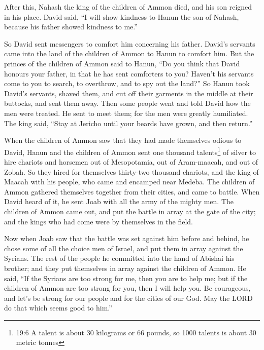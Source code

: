  After this, Nahash the king of the children of Ammon died,
and his son reigned in his place.  David said, ``I will show
kindness to Hanun the son of Nahash, because his father showed kindness
to me.''

So David sent messengers to comfort him concerning his father. David's
servants came into the land of the children of Ammon to Hanun to comfort
him.  But the princes of the children of Ammon said to
Hanun, ``Do you think that David honours your father, in that he has
sent comforters to you? Haven't his servants come to you to search, to
overthrow, and to spy out the land?''  So Hanun took David's
servants, shaved them, and cut off their garments in the middle at their
buttocks, and sent them away.  Then some people went and
told David how the men were treated. He sent to meet them; for the men
were greatly humiliated. The king said, ``Stay at Jericho until your
beards have grown, and then return.''

 When the children of Ammon saw that they had made
themselves odious to David, Hanun and the children of Ammon sent one
thousand talents\footnote{19:6 A talent is about 30 kilograms or 66
  pounds, so 1000 talents is about 30 metric tonnes} of silver to hire
chariots and horsemen out of Mesopotamia, out of Aram-maacah, and out of
Zobah.  So they hired for themselves thirty-two thousand
chariots, and the king of Maacah with his people, who came and encamped
near Medeba. The children of Ammon gathered themselves together from
their cities, and came to battle.  When David heard of it,
he sent Joab with all the army of the mighty men.  The
children of Ammon came out, and put the battle in array at the gate of
the city; and the kings who had come were by themselves in the field.

 Now when Joab saw that the battle was set against him
before and behind, he chose some of all the choice men of Israel, and
put them in array against the Syrians.  The rest of the
people he committed into the hand of Abishai his brother; and they put
themselves in array against the children of Ammon.  He
said, ``If the Syrians are too strong for me, then you are to help me;
but if the children of Ammon are too strong for you, then I will help
you.  Be courageous, and let's be strong for our people and
for the cities of our God. May the LORD do that which seems good to
him.''

